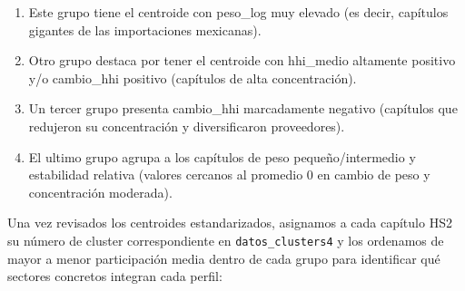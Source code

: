\documentclass[
]{article}
\providecommand{\tightlist}{%
  \setlength{\itemsep}{0pt}\setlength{\parskip}{0pt}}
\begin{document}
\begin{enumerate}
\def\labelenumi{\arabic{enumi}.}
\tightlist
\item
  Este grupo tiene el centroide con peso\_log muy elevado (es decir,
  capítulos gigantes de las importaciones mexicanas).\\
\item
  Otro grupo destaca por tener el centroide con hhi\_medio altamente
  positivo y/o cambio\_hhi positivo (capítulos de alta concentración).\\
\item
  Un tercer grupo presenta cambio\_hhi marcadamente negativo (capítulos
  que redujeron su concentración y diversificaron proveedores).\\
\item
  El ultimo grupo agrupa a los capítulos de peso pequeño/intermedio y
  estabilidad relativa (valores cercanos al promedio 0 en cambio de peso
  y concentración moderada).
\end{enumerate}

Una vez revisados los centroides estandarizados, asignamos a cada
capítulo HS2 su número de cluster correspondiente en
\texttt{datos\_clusters4} y los ordenamos de mayor a menor participación
media dentro de cada grupo para identificar qué sectores concretos
integran cada perfil:
\end{document}
